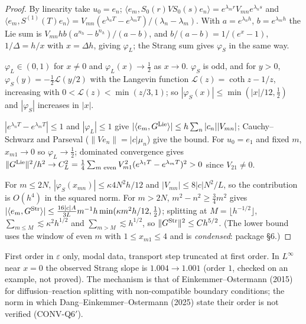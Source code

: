 \begin{proof}
By linearity take $u_0=e_n$; $\langle e_m,S_0(r)VS_0(s)e_n\rangle=e^{\lambda_mr}V_{mn}e^{\lambda_ns}$ and $\langle e_m,S^{(1)}(T)e_n\rangle=V_{mn}(e^{\lambda_nT}-e^{\lambda_mT})/(\lambda_n-\lambda_m)$. With $a=e^{\lambda_nh}$, $b=e^{\lambda_mh}$ the Lie sum is $V_{mn}hb(a^{n_h}-b^{n_h})/(a-b)$, and $b/(a-b)=1/(e^x-1)$, $1/\Delta=h/x$ with $x=\Delta h$, giving $\varphi_L$; the Strang sum gives $\varphi_S$ in the same way.

$\varphi_L\in(0,1)$ for $x\ne0$ and $\varphi_L(x)\to\frac12$ as $x\to0$. $\varphi_S$ is odd, and for $y>0$, $\varphi_S(y)=-\frac12\mathcal L(y/2)$ with the Langevin function $\mathcal L(z)=\coth z-1/z$, increasing with $0<\mathcal L(z)<\min(z/3,1)$; so $|\varphi_S(x)|\le\min(|x|/12,\frac12)$ and $|\varphi_S|$ increases in $|x|$.

$|e^{\lambda_nT}-e^{\lambda_mT}|\le1$ and $|\varphi_L|\le1$ give $|\langle e_m,G^{\rm Lie}\rangle|\le h\sum_n|c_n||V_{mn}|$; Cauchy--Schwarz and Parseval ($\|Ve_n\|=|c|\mu_n$) give the bound. For $u_0=e_1$ and fixed $m$, $x_{m1}\to0$ so $\varphi_L\to\frac12$; dominated convergence gives $\|G^{\rm Lie}\|^2/h^2\to C_L^2=\frac14\sum_{m\text{ even}}V_{m1}^2(e^{\lambda_1T}-e^{\lambda_mT})^2>0$ since $V_{21}\ne0$.

For $m\le2N$, $|\varphi_S(x_{mn})|\le\kappa4N^2h/12$ and $|V_{mn}|\le8|c|N^2/L$, so the contribution is $O(h^4)$ in the squared norm. For $m>2N$, $m^2-n^2\ge\frac34m^2$ gives $|\langle e_m,G^{\rm Str}\rangle|\le\frac{16|c|A}{3L}m^{-1}h\min(\kappa m^2h/12,\frac12)$; splitting at $M=\lfloor h^{-1/2}\rfloor$, $\sum_{m\le M}\lesssim\kappa^2h^{1/2}$ and $\sum_{m>M}\lesssim h^{1/2}$, so $\|G^{\rm Str}\|^2\le Ch^{5/2}$. (The lower bound uses the window of even $m$ with $1\le x_{m1}\le4$ and is \emph{condensed}: package \S6.)

\end{proof}

\begin{caution}[title=Scope and priority]
First order in $\varepsilon$ only, modal data, transport step truncated at first order. In $L^\infty$ near $x=0$ the observed Strang slope is $1.004\to1.001$ (order $1$, checked on an example, not proved). The mechanism is that of Einkemmer--Ostermann (2015) for diffusion--reaction splitting with non-compatible boundary conditions; the norm in which Dang--Einkemmer--Ostermann (2025) state their order is not verified (CONV-Q6$'$).
\end{caution}
